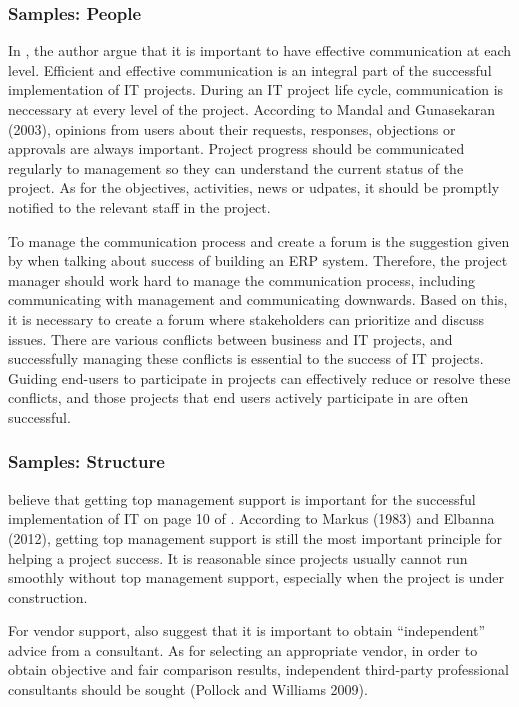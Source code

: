 \subsubsection{Samples: People}
In , the author argue that it is important to have effective communication at each level. Efficient and effective communication is an integral part of the successful implementation of IT projects. During an IT project life cycle, communication is neccessary at every level of the project. According to Mandal and Gunasekaran (2003), opinions from users about their requests, responses, objections or approvals are always important. Project progress should be communicated regularly to management so they can understand the current status of the project. As for the objectives, activities, news or udpates, it should be promptly notified to the relevant staff in the project.


To manage the communication process and create a forum is the suggestion given by \citeauthor{2} when talking about success of building an ERP system. Therefore, the project manager should work hard to manage the communication process, including communicating with management and communicating downwards. Based on this, it is necessary to create a forum where stakeholders can prioritize and discuss issues. There are various conflicts between business and IT projects, and successfully managing these conflicts is essential to the success of IT projects. Guiding end-users to participate in projects can effectively reduce or resolve these conflicts, and those projects that end users actively participate in are often successful.

\subsubsection{Samples: Structure}
\citeauthor{6} believe that getting top management support is important for the successful implementation of IT on page 10 of . According to Markus (1983) and Elbanna (2012), getting top management support is still the most important principle for helping a project success. It is reasonable since projects usually cannot run smoothly without top management support, especially when the project is under construction.

For vendor support, \citeauthor{6} also suggest that it is important to obtain “independent” advice from a consultant. As for selecting an appropriate vendor, in order to obtain objective and fair comparison results, independent third-party professional consultants should be sought (Pollock and Williams 2009).

